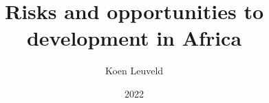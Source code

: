 




\title{Risks and opportunities to development in Africa}
\author{Koen Leuveld}
\date{2022}

\maketitle
\tableofcontents
\todototoc
\listoftodos

 









